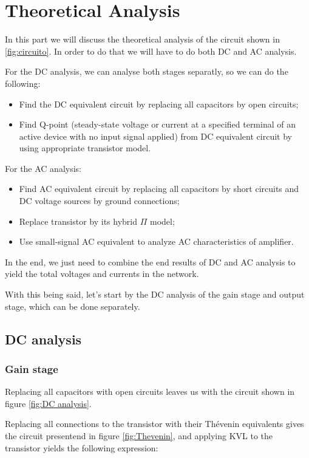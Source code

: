 \clearpage

\section{Theoretical Analysis}
\label{sec:analysis}

In this part we will discuss the theoretical analysis of the circuit shown in \ref{fig:circuito}.
In order to do that we will have to do both DC and AC analysis.

For the DC analysis, we can analyse both stages separatly, so we can do the following:
\begin{itemize}
    \item Find the DC equivalent circuit by replacing all capacitors by open circuits;
    \item Find Q-point (steady-state voltage or current at a specified terminal of an active device with no input signal applied) from DC equivalent circuit by using appropriate transistor model.
\end{itemize}

For the AC analysis:
\begin{itemize}
    \item Find AC equivalent circuit by replacing all capacitors by short circuits and DC voltage sources by ground connections;
    \item Replace transistor by its hybrid $\Pi$ model;
    \item Use small-signal AC equivalent to analyze AC characteristics of amplifier.
\end{itemize}

In the end, we just need to combine the end results of DC and AC analysis to yield the total voltages and currents in the network.

With this being said, let's start by the DC analysis of the gain stage and output stage, which can be done separately.

\subsection{DC analysis}
\subsubsection{Gain stage}
Replacing all capacitors with open circuits leaves us with the circuit shown in figure \ref{fig:DC analysis}.

Replacing all connections to the transistor with their Thévenin equivalents gives the circuit presentend in figure
\ref{fig:Thevenin}, and applying KVL to the transistor yields the following expression: 

